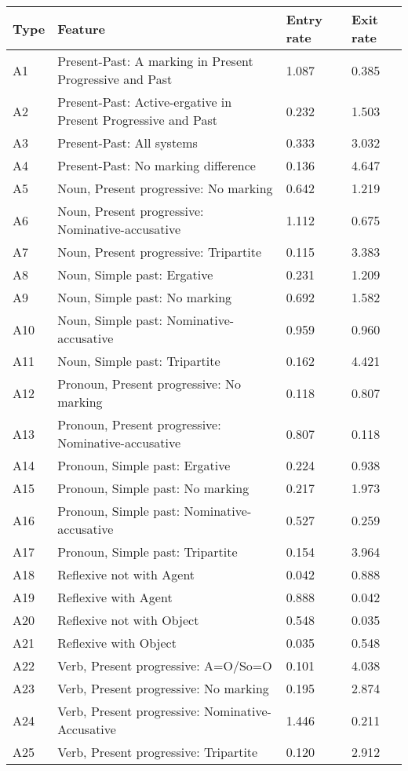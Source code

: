 \begin{longtable}{llll}
\toprule
Type & Feature & Entry rate & Exit rate\\
\midrule
A1 & Present-Past: A marking in Present Progressive and Past & 1.087 & 0.385\\
A2 & Present-Past: Active-ergative in Present Progressive and Past & 0.232 & 1.503\\
A3 & Present-Past: All systems & 0.333 & 3.032\\
A4 & Present-Past: No marking difference & 0.136 & 4.647\\
A5 & Noun, Present progressive: No marking & 0.642 & 1.219\\
A6 & Noun, Present progressive: Nominative-accusative & 1.112 & 0.675\\
A7 & Noun, Present progressive: Tripartite & 0.115 & 3.383\\
A8 & Noun, Simple past: Ergative & 0.231 & 1.209\\
A9 & Noun, Simple past: No marking & 0.692 & 1.582\\
A10 & Noun, Simple past: Nominative-accusative & 0.959 & 0.960\\
A11 & Noun, Simple past: Tripartite & 0.162 & 4.421\\
A12 & Pronoun, Present progressive: No marking & 0.118 & 0.807\\
A13 & Pronoun, Present progressive: Nominative-accusative & 0.807 & 0.118\\
A14 & Pronoun, Simple past: Ergative & 0.224 & 0.938\\
A15 & Pronoun, Simple past: No marking & 0.217 & 1.973\\
A16 & Pronoun, Simple past: Nominative-accusative & 0.527 & 0.259\\
A17 & Pronoun, Simple past: Tripartite & 0.154 & 3.964\\
A18 & Reflexive not with Agent & 0.042 & 0.888\\
A19 & Reflexive with Agent & 0.888 & 0.042\\
A20 & Reflexive not with Object & 0.548 & 0.035\\
A21 & Reflexive with Object & 0.035 & 0.548\\
A22 & Verb, Present progressive: A=O/So=O & 0.101 & 4.038\\
A23 & Verb, Present progressive: No marking & 0.195 & 2.874\\
A24 & Verb, Present progressive: Nominative-Accusative & 1.446 & 0.211\\
A25 & Verb, Present progressive: Tripartite & 0.120 & 2.912\\

\end{longtable}
